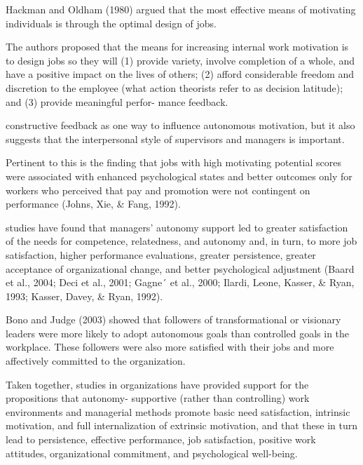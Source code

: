 Hackman and Oldham (1980) argued that the most effective means of motivating individuals is through the optimal design of jobs.

The authors proposed that the means for increasing internal work motivation is to design jobs so they will (1) provide variety, involve completion of a whole, and have a positive impact on the lives of others; (2) afford considerable freedom and discretion to the employee (what action theorists refer to as decision latitude); and (3) provide meaningful perfor-
mance feedback.

constructive feedback as one way to inﬂuence autonomous motivation, but it also suggests that the interpersonal style of supervisors and managers is important.

Pertinent to this is the ﬁnding that jobs with high motivating potential scores were associated with enhanced psychological states and better outcomes only for workers who perceived that pay and promotion were not contingent on performance (Johns, Xie, & Fang, 1992).

studies have found that managers’ autonomy support led to greater satisfaction of the needs for competence, relatedness, and autonomy and, in turn, to more job satisfaction, higher performance evaluations, greater persistence, greater acceptance of organizational change, and better psychological adjustment (Baard et al., 2004; Deci et al., 2001; Gagne´ et al., 2000; Ilardi, Leone, Kasser, \& Ryan, 1993; Kasser, Davey, & Ryan, 1992).

Bono and Judge (2003) showed that followers of transformational or visionary leaders were more likely to adopt autonomous goals than controlled goals in the workplace. These followers were also more satisﬁed with their jobs and more affectively committed to the organization.

Taken together, studies in organizations have provided support for the propositions that autonomy-
supportive (rather than controlling) work environments and managerial methods promote basic need satisfaction, intrinsic motivation, and full internalization of extrinsic motivation, and that these in turn lead to persistence, effective performance, job satisfaction, positive work attitudes, organizational commitment, and psychological well-being.



